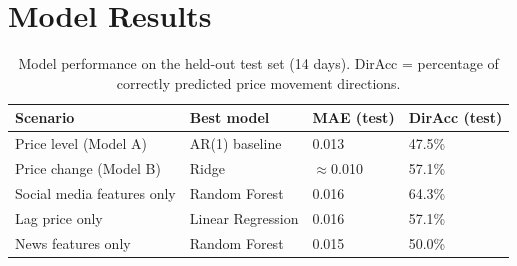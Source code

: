 \newpage
\section{Model Results}
\label{app:results}

\begin{table}[ht]
\centering
\small
\begin{tabular}{p{5.5cm} p{3.0cm} p{2.0cm} p{2.5cm}}
\toprule
\textbf{Scenario} & \textbf{Best model} & \textbf{MAE (test)} & \textbf{DirAcc (test)} \\
\midrule
Price level (Model A)       & AR(1) baseline    & 0.013          & 47.5\% \\
Price change (Model B)      & Ridge             & $\approx$0.010 & 57.1\% \\
Social media features only  & Random Forest     & 0.016          & 64.3\% \\
Lag price only              & Linear Regression & 0.016          & 57.1\% \\
News features only          & Random Forest     & 0.015          & 50.0\% \\
\bottomrule
\end{tabular}
\caption{Model performance on the held-out test set (14 days). DirAcc = percentage of correctly predicted price movement directions.}
\label{tab:results}
\end{table}

